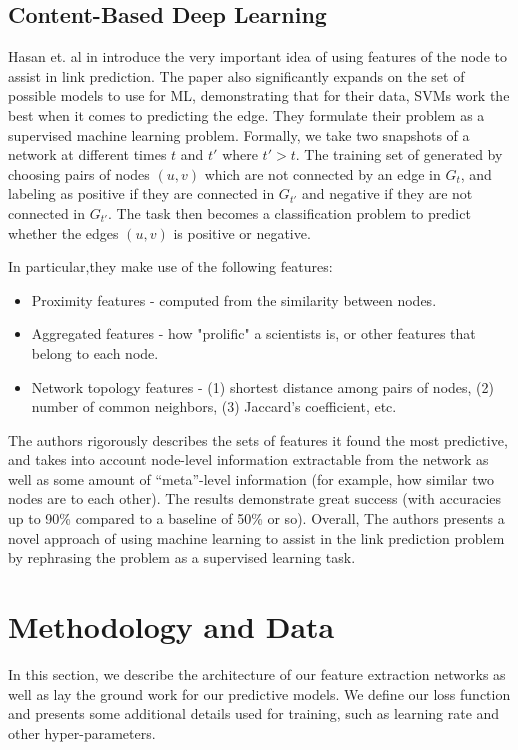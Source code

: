 \documentclass[letterpaper, 10 pt, conference]{ieeeconf}  %
\begin{document}
\subsection{Content-Based Deep Learning}
Hasan et. al in \cite{Hasan06linkprediction} introduce the very important idea of using features of the node to assist in link prediction. The paper also significantly expands on the set of possible models to use for ML, demonstrating that for their data, SVMs work the best when it comes to predicting the edge. They formulate their problem as a supervised machine learning problem. Formally, we take two snapshots of a network at different times $t$ and $t'$ where $t' > t$. The training set of generated by choosing pairs of nodes $(u,v)$ which are not connected by an edge in $G_t$, and labeling as positive if they are connected in $G_{t'}$ and negative if they are not connected in $G_{t'}$. The task then becomes a classification problem to predict whether the edges $(u,v)$ is positive or negative. 

In particular,they make use of the following features:

\begin{itemize}
\item Proximity features - computed from the similarity between nodes.
\item Aggregated features - how "prolific" a scientists is, or other features that belong to each node.
\item Network topology features - (1) shortest distance among pairs of nodes, (2) number of common neighbors, (3) Jaccard's coefficient, etc.
\end{itemize}

The authors rigorously describes the sets of features it found the most predictive, and takes into account node-level information extractable from the network as well as some amount of ``meta''-level information (for example, how similar two nodes are to each other). The results demonstrate great success (with accuracies up to 90\% compared to a baseline of 50\% or so). Overall, The authors presents a novel approach of using machine learning to assist in the link prediction problem by rephrasing the problem as a supervised learning task.

\section{Methodology and Data}
In this section, we describe the architecture of our feature extraction networks as well as lay the ground work for our predictive models. We define our loss function and presents some additional details used for training, such as learning rate and other hyper-parameters.
\end{document}
